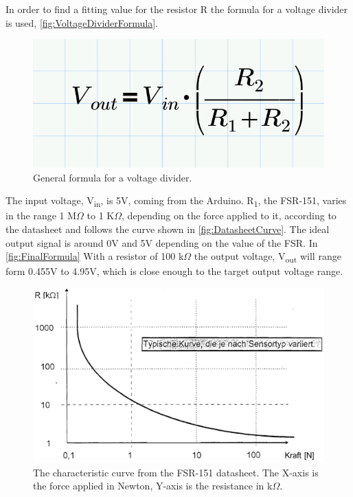 In order to find a fitting value for the resistor R the formula for a voltage divider is used, \autoref{fig:VoltageDividerFormula}.
\begin{figure}[H]
\centering
\includegraphics[scale=0.15]{Figure/VoltageDividerFormula.png}
\caption{General formula for a voltage divider.}
\label{fig:VoltageDividerFormula}
\end{figure}

The input voltage, V\textsubscript{in}, is 5V, coming from the Arduino. R\textsubscript{1}, the FSR-151, varies in the range 1 M$\Omega$ to 1 K$\Omega$, depending on the force applied to it, according to the datasheet and follows the curve shown in \autoref{fig:DatasheetCurve}. The ideal output signal is around 0V and 5V depending on the value of the FSR. In \autoref{fig:FinalFormula} With a resistor of 100 k$\Omega$ the output voltage, V\textsubscript{out} will range form 0.455V to 4.95V, which is close enough to the target output voltage range. 
\begin{figure}[H]
\centering
\includegraphics[scale=0.15]{Figure/DatasheetCurve.png}
\caption{The characteristic curve from the FSR-151 datasheet. The X-axis is the force applied in Newton, Y-axis is the resistance in k$\Omega$.}
\label{fig:DatasheetCurve}
\end{figure}

